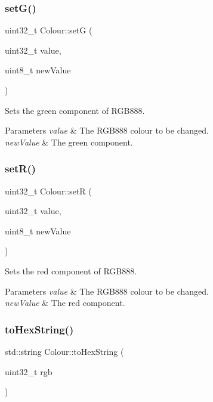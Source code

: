 \subsubsection{\texorpdfstring{set\+G()}{setG()}}
{\footnotesize\ttfamily uint32\+\_\+t Colour\+::setG (\begin{DoxyParamCaption}\item[{uint32\+\_\+t}]{value,  }\item[{uint8\+\_\+t}]{new\+Value }\end{DoxyParamCaption})}



Sets the green component of R\+G\+B888. 


\begin{DoxyParams}{Parameters}
{\em value} & The R\+G\+B888 colour to be changed. \\
\hline
{\em new\+Value} & The green component. \\
\hline
\end{DoxyParams}
\mbox{\label{namespaceColour_aafcc8ab12acc526fa93bee12b961edab}} 
\subsubsection{\texorpdfstring{set\+R()}{setR()}}
{\footnotesize\ttfamily uint32\+\_\+t Colour\+::setR (\begin{DoxyParamCaption}\item[{uint32\+\_\+t}]{value,  }\item[{uint8\+\_\+t}]{new\+Value }\end{DoxyParamCaption})}



Sets the red component of R\+G\+B888. 


\begin{DoxyParams}{Parameters}
{\em value} & The R\+G\+B888 colour to be changed. \\
\hline
{\em new\+Value} & The red component. \\
\hline
\end{DoxyParams}
\mbox{\label{namespaceColour_a2289444135d7196963b284cdd7f13fff}} 
\subsubsection{\texorpdfstring{to\+Hex\+String()}{toHexString()}}
{\footnotesize\ttfamily std\+::string Colour\+::to\+Hex\+String (\begin{DoxyParamCaption}\item[{uint32\+\_\+t}]{rgb }\end{DoxyParamCaption})}



